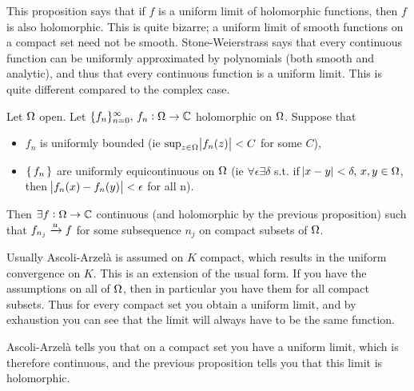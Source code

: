 \begin{note}
This proposition says that if $f$ is a uniform limit of holomorphic functions, then $f$ is also holomorphic. This is quite bizarre; a uniform limit of smooth functions on a compact set need not be smooth. Stone-Weierstrass says that every continuous function can be uniformly approximated by polynomials (both smooth and analytic), and thus that every continuous function is a uniform limit. This is quite different compared to the complex case.
\end{note}


\begin{theorem}\label{thm:ascoli-arzela}
Let $\Omega$ open. Let $\{f_n \}_{n=0}^\infty, \, f_n : \Omega \to \mathbb{C}$ holomorphic on $\Omega$. Suppose that
\begin{itemize}
    \item $f_n$ is uniformly bounded (ie $\sup_{z\in \Omega} \abs{f_n(z)} < C$ for some $C$),
    \item $\set{ f_n }$ are uniformly equicontinuous on $\Omega$ (ie $\forall \epsilon \exists \delta$ s.t. if $\abs{x-y} < \delta, \, x,y \in \Omega$, then $\abs{f_n(x) - f_n(y)} < \epsilon$ for all n).
\end{itemize}

Then $\exists f:\Omega \rightarrow \mathbb{C}$ continuous (and holomorphic by the previous proposition) such that $f_{n_j} \xrightarrow[]{u} f$ for some subsequence $n_j$ on compact subsets of $\Omega$.

\end{theorem}
 
\begin{note}\label{note:after-ascoli-arzela}
Usually Ascoli-Arzelà is assumed on $K$ compact, which results in the uniform convergence on $K$. This is an extension of the usual form. If you have the assumptions on all of $\Omega$, then in particular you have them for all compact subsets. Thus for every compact set you obtain a uniform limit, and by exhaustion you can see that the limit will always have to be the same function.

Ascoli-Arzelà tells you that on a compact set you have a uniform limit, which is therefore continuous, and the previous proposition tells you that this limit is holomorphic.
\end{note}